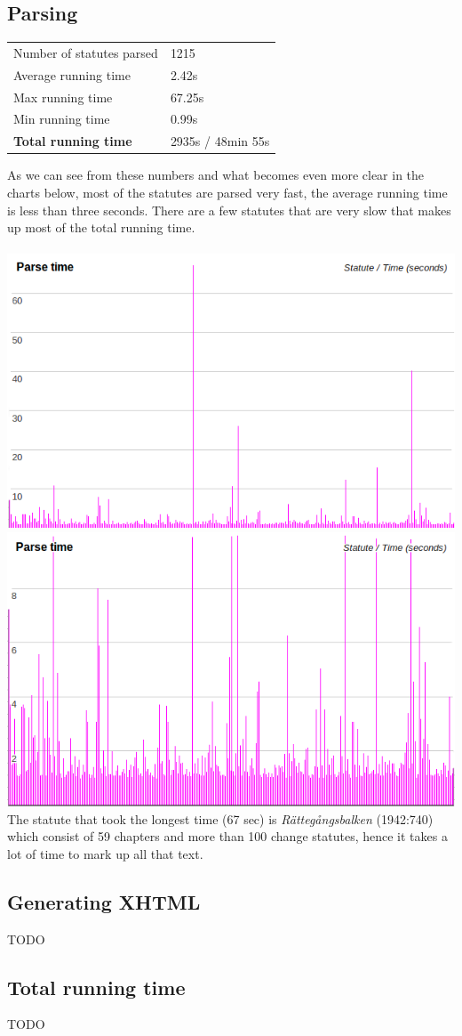 \subsection{Parsing}
\begin{tabular}{l l}
Number of statutes parsed & 1215\\
Average running time	& 2.42s\\
Max running time &  67.25s\\
Min running time & 0.99s\\
\textbf{Total running time} & 2935s / 48min 55s\\
\end{tabular}
\linebreak
\newline
As we can see from these numbers and what becomes even more clear in the charts below, most of the statutes are parsed very fast, the average running time is less than three seconds. There are a few statutes that are very slow that makes up most of the total running time.\\\\
\includegraphics[scale=0.6]{../imgs/time_parse1.png}
\includegraphics[scale=0.6]{../imgs/time_parse2.png}
The statute that took the longest time (67 sec) is \textit{Rättegångsbalken} (1942:740) which consist of 59 chapters and more than 100 change statutes, hence it takes a lot of time to mark up all that text.

\subsection{Generating XHTML}
TODO
\subsection{Total running time}
TODO
